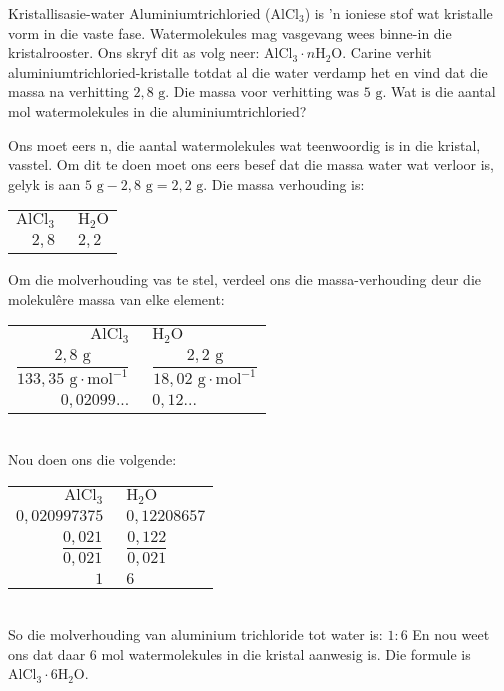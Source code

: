     \noindent
\par
            \label{m38712*eid672431}
      \noindent
      \begin{wex}{Kristallisasie-water}{
\label{m38712*pid47982}
\label{m38712*id64827}Aluminiumtrichloried (${\text{AlCl}}_{3}$) is 'n ioniese stof wat kristalle vorm in die vaste fase. Watermolekules mag vasgevang wees binne-in die kristalrooster. Ons skryf dit as volg neer: ${\text{AlCl}}_{3} \cdot n{\text{H}}_{2}\text{O}$. Carine verhit  aluminiumtrichloried-kristalle totdat al die water verdamp het en vind dat die massa na verhitting $2,8 \text{ g}$. Die massa voor verhitting was $5 \text{ g}$. Wat is die aantal mol watermolekules in die aluminiumtrichloried?
}
{
Ons moet eers n, die aantal watermolekules wat teenwoordig is in die kristal, vasstel. Om dit te doen moet ons eers besef dat die massa water wat verloor is, gelyk is aan $5 \text{ g} - 2,8 \text{ g} = 2,2 \text{ g}$.
  \label{m38712*id3892}Die massa verhouding is:\\
\begin{tabular}{r@{:}l}
 $\text{AlCl}_3~$ & $~\text{H}_{2}\text{O}$ \\
   $2,8~$ & $~2,2$ \\
\end{tabular}
Om die molverhouding vas te stel, verdeel ons die massa-verhouding deur die molekul\^{e}re massa van elke element:\\
\begin{tabular}{r@{:}l}
 $\text{AlCl}_3~$ & $~\text{H}_{2}\text{O}$ \\
    $\dfrac{2,8 \text{ g}}{133,35 \text{ g} \cdot \text{mol}^{-1}}~$ & $~\dfrac{2,2 \text{ g}}{18,02 \text{ g} \cdot \text{mol}^{-1}}$ \\
$0,02099...~$ & $~0,12...$  \\
\end{tabular}\\
Nou doen ons die volgende: \\
\begin{tabular}{r@{:}l}
 $\text{AlCl}_3~$ & $~\text{H}_{2}\text{O}$ \\
$0,020997375~$ & $~0,12208657$ \\
$\dfrac{0,021}{0,021}~$ & $~\dfrac{0,122}{0,021}$ \\
$1~$ & $~6$ \\
\end{tabular}\\
So die molverhouding van aluminium trichloride tot water is: $1:6$
En nou weet ons dat daar $6$ mol watermolekules in die kristal aanwesig is. Die formule is $\text{AlCl}_{3} \cdot 6\text{H}_{2}\text{O}$.
}
    \end{wex}
